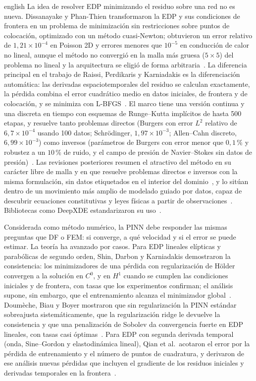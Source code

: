 \documentclass[0000.tex]{subfiles}
\begin{document}
\begin{hyphenrules}{english}
La idea de resolver EDP minimizando el residuo sobre una red no es nueva. Dissanayake y Phan-Thien transformaron la EDP y sus condiciones de frontera en un problema de minimización sin restricciones sobre puntos de colocación, optimizado con un método cuasi-Newton; obtuvieron un error relativo de $1{,}21\times10^{-4}$ en Poisson 2D y errores menores que $10^{-5}$ en conducción de calor no lineal, aunque el método no convergió en la malla más gruesa ($5\times5$) del problema no lineal y la arquitectura se eligió de forma arbitraria~\cite{dissanayake1994neural}. La diferencia principal en el trabajo de Raissi, Perdikaris y Karniadakis es la diferenciación automática: las derivadas espaciotemporales del residuo se calculan exactamente, la pérdida combina el error cuadrático medio en datos iniciales, de frontera y de colocación, y se minimiza con L-BFGS~\cite{raissi2017physics,raissi2019physics}. El marco tiene una versión continua y una discreta en tiempo con esquemas de Runge--Kutta implícitos de hasta 500 etapas, y resuelve tanto problemas directos (Burgers con error $L^2$ relativo de $6{,}7\times10^{-4}$ usando 100 datos; Schrödinger, $1{,}97\times10^{-3}$; Allen--Cahn discreto, $6{,}99\times10^{-3}$) como inversos (parámetros de Burgers con error menor que $0{,}1$\,\% y robustez a un $10$\,\% de ruido, y el campo de presión de Navier--Stokes sin datos de presión)~\cite{raissi2017physics,raissi2017physicsII,raissi2019physics}. Las revisiones posteriores resumen el atractivo del método en su carácter libre de malla y en que resuelve problemas directos e inversos con la misma formulación, sin datos etiquetados en el interior del dominio~\cite{cuomo2022scientific,luo2025physics}, y lo sitúan dentro de un movimiento más amplio de modelado guiado por datos, capaz de descubrir ecuaciones constitutivas y leyes físicas a partir de observaciones~\cite{montans2019data}. Bibliotecas como DeepXDE estandarizaron su uso~\cite{lu2021deepxde}.

Considerada como método numérico, la PINN debe responder las mismas preguntas que DF o FEM: si converge, a qué velocidad y si el error se puede estimar. La teoría ha avanzado por casos. Para EDP lineales elípticas y parabólicas de segundo orden, Shin, Darbon y Karniadakis demostraron la consistencia: los minimizadores de una pérdida con regularización de Hölder convergen a la solución en $C^0$, y en $H^1$ cuando se cumplen las condiciones iniciales y de frontera, con tasas que los experimentos confirman; el análisis supone, sin embargo, que el entrenamiento alcanza el minimizador global~\cite{shin2020convergence}. Doumèche, Biau y Boyer mostraron que sin regularización la PINN estándar sobreajusta sistemáticamente, que la regularización ridge le devuelve la consistencia y que una penalización de Sobolev da convergencia fuerte en EDP lineales, con tasas casi óptimas~\cite{doumeche2025convergence}. Para EDP con segunda derivada temporal (onda, Sine--Gordon y elastodinámica lineal), Qian et al.\ acotaron el error por la pérdida de entrenamiento y el número de puntos de cuadratura, y derivaron de ese análisis nuevas pérdidas que incluyen el gradiente de los residuos iniciales y derivadas temporales en la frontera~\cite{qian2023error}.


\end{hyphenrules}
\end{document}
